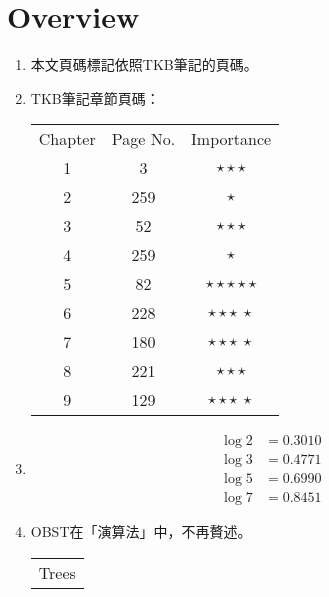 \section{Overview}

\begin{enumerate}
    \item 本文頁碼標記依照TKB筆記\cite{2}的頁碼。
    \item TKB筆記\cite{2}章節頁碼：
    \begin{table}[H]
        \centering
        \begin{tabular}{|c|c|c|}
            \hline
            Chapter & Page No. & Importance \\
            \Xhline{2\arrayrulewidth}
            1 & 3 & $\star\star\star$ \\
            \hline
            2 & 259 & $\star$ \\
            \hline
            3 & 52 & $\star\star\star$ \\
            \hline
            4 & 259 & $\star$ \\
            \hline
            5 & 82 & $\star\star\star\star\star$ \\
            \hline
            6 & 228 & $\star\star\star \ \star$ \\
            \hline
            7 & 180 & $\star\star\star \ \star$ \\
            \hline
            8 & 221 & $\star\star\star$ \\
            \hline
            9 & 129 & $\star\star\star \ \star$ \\
            \hline
        \end{tabular}
    \end{table}
    \item \begin{equation}
        \begin{aligned}
            \log 2 & = 0.3010 \\
            \log 3 & = 0.4771 \\
            \log 5 & = 0.6990 \\
            \log 7 & = 0.8451
        \end{aligned}
    \end{equation}
    \item OBST在「演算法」中，不再贅述。
    \begin{table}[H]
        \centering
        \begin{tabular}{|c|c|c|c|c|}
            \hline
            \multicolumn{5}{|c|}{Trees} \\

\end{tabular}
\end{table}
\end{enumerate}
